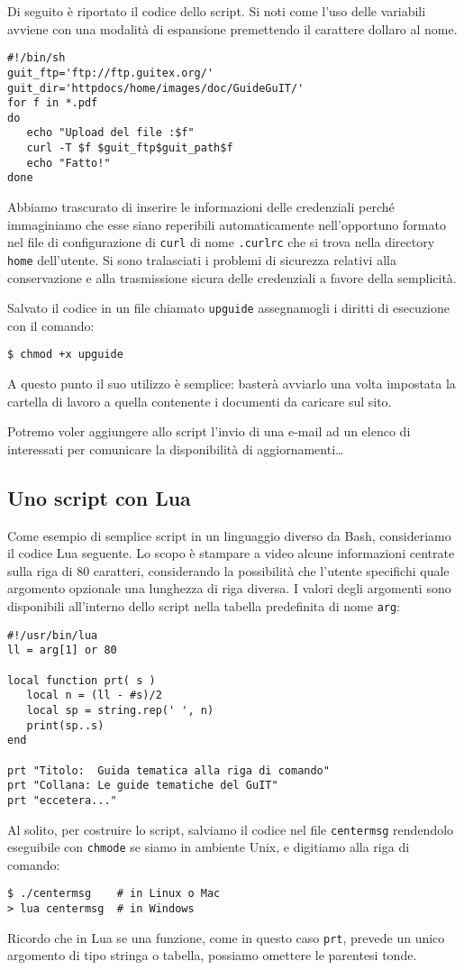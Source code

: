 Di seguito è riportato il codice dello script. Si noti come l'uso delle
variabili avviene con una modalità di espansione premettendo il carattere
dollaro al nome.
\begin{Verbatim}
#!/bin/sh
guit_ftp='ftp://ftp.guitex.org/'
guit_dir='httpdocs/home/images/doc/GuideGuIT/'
for f in *.pdf
do
   echo "Upload del file :$f"
   curl -T $f $guit_ftp$guit_path$f
   echo "Fatto!"
done
\end{Verbatim}

Abbiamo trascurato di inserire le informazioni delle credenziali perché
immaginiamo che esse siano reperibili automaticamente nell'opportuno formato
nel file di configurazione di \texttt{curl} di nome \texttt{.curlrc} che si
trova nella directory \texttt{home} dell'utente. Si sono tralasciati i
problemi di sicurezza relativi alla conservazione e alla trasmissione sicura
delle credenziali a favore della semplicità.

Salvato il codice in un file chiamato \texttt{upguide} assegnamogli i
diritti di esecuzione con il comando:
\begin{Verbatim}
$ chmod +x upguide
\end{Verbatim}
A questo punto il suo utilizzo è semplice: basterà avviarlo una volta impostata
la cartella di lavoro a quella contenente i documenti da caricare sul sito.

Potremo voler aggiungere allo script l'invio di una e-mail ad un elenco di
interessati per comunicare la disponibilità di aggiornamenti\dots

\subsection{Uno script con Lua}

Come esempio di semplice script in un linguaggio diverso da Bash, consideriamo
il codice Lua seguente. Lo scopo è stampare a video alcune informazioni centrate
sulla riga di 80 caratteri, considerando la possibilità che l'utente specifichi
quale argomento opzionale una lunghezza di riga diversa. I valori degli
argomenti sono disponibili all'interno dello script nella tabella predefinita di
nome \texttt{arg}:
\begin{Verbatim}
#!/usr/bin/lua
ll = arg[1] or 80

local function prt( s )
   local n = (ll - #s)/2
   local sp = string.rep(' ', n)
   print(sp..s)
end

prt "Titolo:  Guida tematica alla riga di comando"
prt "Collana: Le guide tematiche del GuIT"
prt "eccetera..."
\end{Verbatim}
Al solito, per costruire lo script, salviamo il codice nel file
\texttt{centermsg} rendendolo eseguibile con \texttt{chmode} se siamo in
ambiente Unix, e digitiamo alla riga di comando:
\begin{Verbatim}
$ ./centermsg    # in Linux o Mac
> lua centermsg  # in Windows
\end{Verbatim}
Ricordo che in Lua se una funzione, come in questo caso \texttt{prt}, prevede
un unico argomento di tipo stringa o tabella, possiamo omettere le parentesi
tonde.


